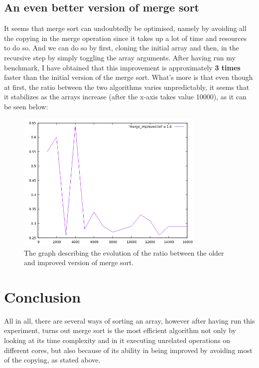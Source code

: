 \documentclass[a4paper,11pt]{article}
\begin{document}
\subsection*{An even better version of merge sort}

It seems that merge sort can undoubtedly be optimised, namely by avoiding all the copying in the merge operation since it takes
up a lot of time and resources to do so. And we can do so by first, cloning the initial array and then, in the recursive step by simply toggling the array arguments.
After having run my benchmark, I have obtained that this improvement is approximately \textbf{3 times} faster than the initial version of the merge sort. \newline\newline
What's more is that even though at first, the ratio between the two algorithms varies unpredictably,
it seems that it stabilizes as the arrays increase (after the x-axis takes value 10000), as it can be seen below: \newline\newline

\begin{figure}[ht]
    \centering
    \includegraphics[width=0.8\textwidth]{merge_improved.png}
    \caption{The graph describing the evolution of the ratio between the older and improved version of merge sort.}
    \label{fig:1}
\end{figure}


\section*{Conclusion}

All in all, there are several ways of sorting an array, however after having run this experiment, turns out merge sort is the most efficient algorithm not only
by looking at its time complexity and in it executing unrelated operations on different cores, but also because of its ability
in being improved by avoiding most of the
copying, as stated above.
\end{document}
